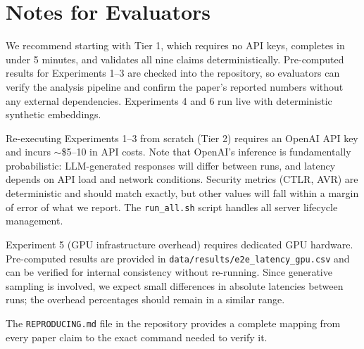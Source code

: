 \documentclass[sigconf]{acmart}
\begin{document}
\section{Notes for Evaluators}

We recommend starting with Tier 1, which requires no API keys, completes in under 5 minutes, and validates all nine claims deterministically. Pre-computed results for Experiments 1--3 are checked into the repository, so evaluators can verify the analysis pipeline and confirm the paper's reported numbers without any external dependencies. Experiments 4 and 6 run live with deterministic synthetic embeddings.

Re-executing Experiments 1--3 from scratch (Tier 2) requires an OpenAI API key and incurs ${\sim}$\$5--10 in API costs. Note that OpenAI's inference is fundamentally probabilistic: LLM-generated responses will differ between runs, and latency depends on API load and network conditions. Security metrics (CTLR, AVR) are deterministic and should match exactly, but other values will fall within a margin of error of what we report. The \texttt{run\_all.sh} script handles all server lifecycle management.

Experiment 5 (GPU infrastructure overhead) requires dedicated GPU hardware. Pre-computed results are provided in \texttt{data/results/e2e\_latency\_gpu.csv} and can be verified for internal consistency without re-running. Since generative sampling is involved, we expect small differences in absolute latencies between runs; the overhead percentages should remain in a similar range.

The \texttt{REPRODUCING.md} file in the repository provides a complete mapping from every paper claim to the exact command needed to verify it.
\end{document}
